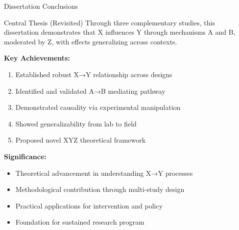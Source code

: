 \documentclass[aspectratio=169,12pt]{beamer}
\begin{document}
\begin{frame}{Dissertation Conclusions}
  \begin{exampleblock}{Central Thesis (Revisited)}
    Through three complementary studies, this dissertation demonstrates that X influences Y through mechanisms A and B, moderated by Z, with effects generalizing across contexts.
  \end{exampleblock}

  \vspace{0.5cm}

  \textbf{Key Achievements:}
  \begin{enumerate}
    \item Established robust X→Y relationship across designs
    \item Identified and validated A→B mediating pathway
    \item Demonstrated causality via experimental manipulation
    \item Showed generalizability from lab to field
    \item Proposed novel XYZ theoretical framework
  \end{enumerate}

  \vspace{0.5cm}

  \textbf{Significance:}
  \begin{itemize}
    \item Theoretical advancement in understanding X→Y processes
    \item Methodological contribution through multi-study design
    \item Practical applications for intervention and policy
    \item Foundation for sustained research program
  \end{itemize}
\end{frame}
\end{document}
